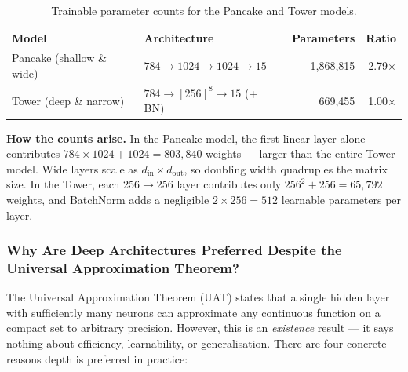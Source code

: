 \documentclass[11pt,a4paper]{article}
\begin{document}
\begin{table}[H]
\centering
\begin{tabular}{llrr}
\toprule
Model & Architecture & Parameters & Ratio \\
\midrule
Pancake (shallow \& wide) & $784 \to 1024 \to 1024 \to 15$ & 1,868,815 & 2.79$\times$ \\
Tower (deep \& narrow)    & $784 \to [256]^8 \to 15$ (+ BN) & 669,455   & 1.00$\times$ \\
\bottomrule
\end{tabular}
\caption{Trainable parameter counts for the Pancake and Tower models.}
\end{table}

\textbf{How the counts arise.} In the Pancake model, the first linear layer alone contributes $784 \times 1024 + 1024 = 803{,}840$ weights — larger than the entire Tower model. Wide layers scale as $d_\text{in} \times d_\text{out}$, so doubling width quadruples the matrix size. In the Tower, each 256$\to$256 layer contributes only $256^2 + 256 = 65{,}792$ weights, and BatchNorm adds a negligible $2 \times 256 = 512$ learnable parameters per layer.

\subsubsection*{Why Are Deep Architectures Preferred Despite the Universal Approximation Theorem?}

The Universal Approximation Theorem (UAT) states that a single hidden layer with sufficiently many neurons can approximate any continuous function on a compact set to arbitrary precision. However, this is an \emph{existence} result — it says nothing about efficiency, learnability, or generalisation. There are four concrete reasons depth is preferred in practice:
\end{document}
